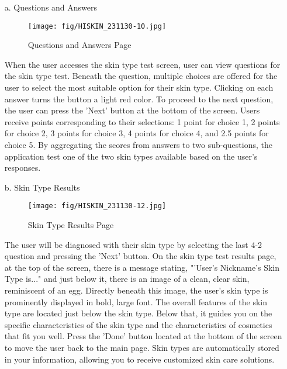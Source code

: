 \documentclass[conference]{IEEEtran}
\begin{document}
\begin{itemize}
    \item[a.]Questions and Answers
    \begin{figure}[h]
    \centering
    \texttt{[image: fig/HISKIN\_231130-10.jpg]}
    \label{fig:Questions and Answers}
    \caption{Questions and Answers Page} 
    \end{figure}
    \item[]When the user accesses the skin type test screen, user can view questions for the skin type test. Beneath the question, multiple choices are offered for the user to select the most suitable option for their skin type. Clicking on each answer turns the button a light red color. To proceed to the next question, the user can press the 'Next' button at the bottom of the screen. Users receive points corresponding to their selections: 1 point for choice 1, 2 points for choice 2, 3 points for choice 3, 4 points for choice 4, and 2.5 points for choice 5. By aggregating the scores from answers to two sub-questions, the application test one of the two skin types available based on the user's responses. \\ 

    \item[b.]Skin Type Results
    \begin{figure}[h]
    \centering
    \texttt{[image: fig/HISKIN\_231130-12.jpg]}
    \label{fig:Skin Type Results Page}
    \caption{Skin Type Results Page} 
    \end{figure}
    \item[]The user will be diagnosed with their skin type by selecting the last 4-2 question and pressing the ’Next’ button. On the skin type test results page, at the top of the screen, there is a message stating, "'User's Nickname's Skin Type is..." and just below it, there is an image of a clean, clear skin, reminiscent of an egg. Directly beneath this image, the user's skin type is prominently displayed in bold, large font. The overall features of the skin type are located just below the skin type. Below that, it guides you on the specific characteristics of the skin type and the characteristics of cosmetics that fit you well. Press the ’Done’ button located at the bottom of the screen to move the user back to the main page. Skin types are automatically stored in your information, allowing you to receive customized skin care solutions. \\ 
\end{itemize}
\end{document}
